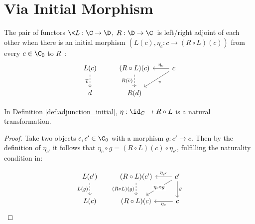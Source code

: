 \section{Via Initial Morphism}

\begin{definition}
  The pair of functors $\<L: \C\to \D$, $R: \D\to \C\>$ is left/right adjoint of
  each other when there is an initial morphism $(L(c), \eta_c:c\to (R\circ
  L)(c))$ from every $c\in \C_0$ to
  $R$~\parencite[p.~208]{awodey:category_theory}:
  \[\begin{tikzcd}[ampersand replacement=\&]
    {L(c)} \& {(R\circ L)(c)} \& c \\
    d \& {R(d)}
    \arrow["{\overline{v}}"', dashed, from=1-1, to=2-1]
    \arrow["{R(\overline{v})}"', dashed, from=1-2, to=2-2]
    \arrow["v", from=1-3, to=2-2]
    \arrow["{\eta_c}"', from=1-3, to=1-2]
  \end{tikzcd}\]
\end{definition}

\begin{theorem}
  In Definition \ref{def:adjunction_initial}, $\eta:\id_C \to R\circ L$ is a
  natural transformation.

  \begin{proof}
    Take two objects $c,c'\in \C_0$ with a morphism $g:c'\to c$. Then by the
    definition of $\eta_{c'}$ it follows that $\eta_c\circ g = (R\circ
    L)(c)\circ \eta_{c'}$, fulfilling the naturality condition in:

    \[\begin{tikzcd}[ampersand replacement=\&]
      {L(c')} \& {(R\circ L)(c')} \& {c'} \\
      {L(c)} \& {(R\circ L)(c)} \& c
      \arrow["{\eta_c}", from=2-3, to=2-2]
      \arrow["{\eta_{c'}}"', from=1-3, to=1-2]
      \arrow["g", from=1-3, to=2-3]
      \arrow["{(R\circ L)(g)}"', dashed, from=1-2, to=2-2]
      \arrow["{L(g)}"', dashed, from=1-1, to=2-1]
      \arrow["{\eta_c\circ g}"{description}, from=1-3, to=2-2]
    \end{tikzcd}\]
  \end{proof}
\end{theorem}

